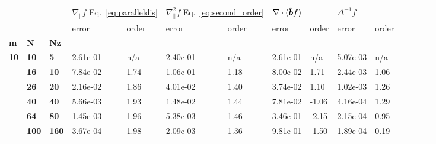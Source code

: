\begin{tabular}{lllllllllllllll}
\toprule
  &     &     & \multicolumn{2}{l}{$\nabla_\parallel f$
  Eq.~\eqref{eq:paralleldis}}  &
  \multicolumn{2}{l}{$\nabla_\parallel^2 f$ Eq.~\eqref{eq:second_order}} & \multicolumn{2}{l}{$\nabla\cdot(\bm{\hat{b}} f)$} &
  \multicolumn{2}{l}{$\Delta_\parallel^{-1}f $} \\
  &    &     &     error & order &     error & order &       error &  order &          error & order \\
\textbf{m} & \textbf{N} & \textbf{Nz} &           &       &           &       &             &        &                &       \\
\midrule
\textbf{10} & \textbf{10 } & \textbf{5  } &  2.61e-01 & n/a &  2.40e-01 & n/a &    2.61e-01 & n/a  &       5.07e-03 & n/a \\
            & \textbf{16} & \textbf{10 } &  7.84e-02 & 1.74 &  1.06e-01 & 1.18 &    8.00e-02 & 1.71  &       2.44e-03 & 1.06 \\
            & \textbf{26} & \textbf{20 } &  2.16e-02 & 1.86 &  4.01e-02 & 1.40 &    3.74e-02 & 1.10  &       1.02e-03 & 1.26 \\
            & \textbf{40} & \textbf{40 } &  5.66e-03 & 1.93 &  1.48e-02 & 1.44 &    7.81e-02 & -1.06  &       4.16e-04 & 1.29 \\
            & \textbf{64} & \textbf{80 } &  1.45e-03 & 1.96 &  5.38e-03 & 1.46 &    3.46e-01 & -2.15  &       2.15e-04 & 0.95 \\
            & \textbf{100} & \textbf{160} &  3.67e-04 & 1.98 &  2.09e-03 & 1.36 &    9.81e-01 &  -1.50 &       1.89e-04 & 0.19 \\
\bottomrule
\end{tabular}
